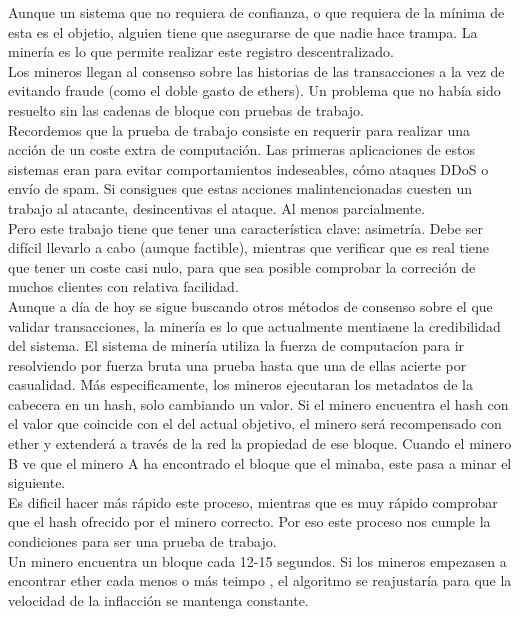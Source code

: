 \documentclass[11pt,a4paper]{article}
\begin{document}
Aunque un sistema que no requiera de confianza, o que requiera de la mínima de esta es el objetio, alguien tiene que asegurarse de que nadie hace trampa. La minería es lo que permite realizar este registro descentralizado. \\

Los mineros llegan al consenso sobre las historias de las transacciones a la vez de evitando fraude (como el doble gasto de ethers). Un problema que no había sido resuelto sin las cadenas de bloque con pruebas de trabajo.\\

Recordemos que la prueba de trabajo consiste en requerir para realizar una acción de un coste extra de computación. Las primeras aplicaciones de estos sistemas eran para evitar comportamientos indeseables, cómo ataques DDoS o envío de spam. Si consigues que estas acciones malintencionadas cuesten un trabajo al atacante, desincentivas el ataque. Al menos parcialmente.\\

Pero este trabajo tiene que tener una característica clave: asimetría. Debe ser difícil llevarlo a cabo (aunque factible), mientras que verificar que es real tiene que tener un coste casi nulo, para que sea posible comprobar la correción de muchos clientes con relativa facilidad.\\


Aunque a día de hoy se sigue buscando otros métodos de consenso sobre el que validar transacciones, la minería es lo que actualmente mentiaene la credibilidad del sistema. El sistema de minería utiliza la fuerza de computacíon para ir resolviendo por fuerza bruta una prueba hasta que una de ellas acierte por casualidad. Más especificamente, los mineros ejecutaran los metadatos de la cabecera en un hash, solo cambiando un valor. Si el minero encuentra el hash con el valor que coincide con el del actual objetivo, el minero será recompensado con ether y extenderá a través de la red la propiedad de ese bloque. Cuando el minero B ve que el minero A ha encontrado el bloque que el minaba, este pasa a minar el siguiente.\\

Es dificil hacer más rápido este proceso, mientras que es muy rápido comprobar que el hash ofrecido por el minero correcto. Por eso este proceso nos cumple la condiciones para ser una prueba de trabajo.\\

Un minero encuentra un bloque cada 12-15 segundos. Si los mineros empezasen a encontrar ether cada menos o más teimpo , el algoritmo se reajustaría para que la velocidad de la inflacción se mantenga constante.\\
\end{document}
